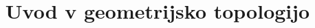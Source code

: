 \documentclass[11pt, a4paper]{article}
\begin{document}
\title{Uvod v geometrijsko topologijo}
\maketitle

\newpage


\newpage

\end{document}
